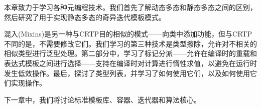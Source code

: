 本章致力于学习各种元编程技术。我们首先了解动态多态和静态多态之间的区别，然后研究了用于实现静态多态的奇异迭代模板模式。

混入(Mixins)是另一种与CRTP目的相似的模式——向类中添加功能，但与CRTP不同的是，不需要修改它们。我们学习的第三种技术是类型擦除，允许对不相关的相似类型进行泛型处理。第二部分中，学习了标记分派——允许在编译时的重载和表达式模板之间进行选择——支持在编译时对计算进行惰性求值，以避免在运行时发生低效操作。最后，探讨了类型列表，并学习了如何使用它们，以及如何使用它们实现操作。

下一章中，我们将讨论标准模板库、容器、迭代器和算法核心。